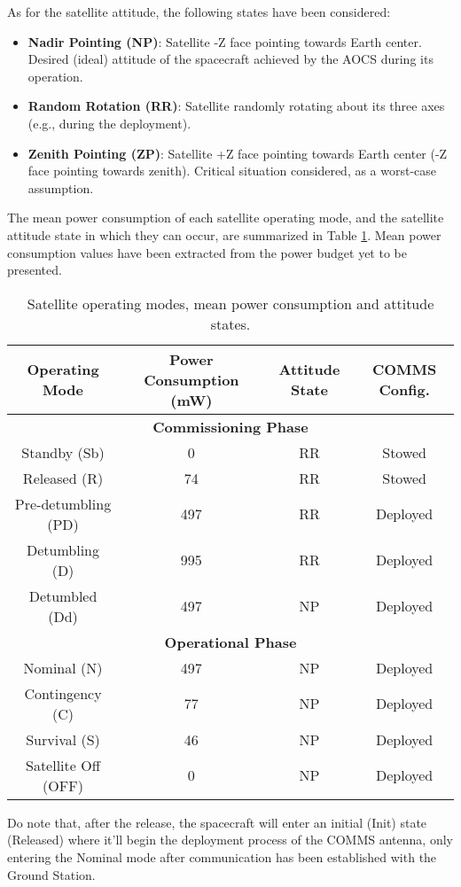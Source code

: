 As for the satellite attitude, the following states have been considered:

\begin{itemize}
    \item \textbf{Nadir Pointing (NP)}: Satellite -Z face pointing towards Earth center. Desired (ideal) attitude of the spacecraft achieved by the AOCS during its operation.
    \item \textbf{Random Rotation (RR)}: Satellite randomly rotating about its three axes (e.g., during the deployment).
    \item \textbf{Zenith Pointing (ZP)}: Satellite +Z face pointing towards Earth center (-Z face pointing towards zenith). Critical situation considered, as a worst-case assumption.
\end{itemize}

The mean power consumption of each satellite operating mode, and the satellite attitude state in which they can occur, are summarized in Table \ref{tab:satellite_modes}.
Mean power consumption values have been extracted from the power budget yet to be presented.


\begin{table}[H]
    \centering
    \begin{tabular}{cccc}
        \toprule
        \textbf{Operating Mode} & \textbf{Power Consumption (mW)} & \textbf{Attitude State} & \textbf{COMMS Config.} \\
        \midrule
        \multicolumn{4}{c}{\textbf{Commissioning Phase}} \\
        Standby (Sb)        & 0 & RR             & Stowed   \\
        Released (R)        & 74 & RR             & Stowed   \\
        Pre-detumbling (PD) & 497 & RR             & Deployed   \\
        Detumbling (D)      & 995 & RR             & Deployed   \\
        Detumbled (Dd)      & 497 & NP     & Deployed   \\
        \midrule
        \multicolumn{4}{c}{\textbf{Operational Phase}} \\
        Nominal (N)         & 497 & NP        & Deployed \\
        Contingency (C)     & 77 & NP      & Deployed \\
        Survival (S)        & 46 & NP       & Deployed \\
        Satellite Off (OFF) & 0 & NP       & Deployed \\
        \bottomrule
    \end{tabular}
    \caption{Satellite operating modes, mean power consumption and attitude states.}
    \label{tab:satellite_modes}
\end{table}
Do note that, after the release, the spacecraft will enter an initial (Init) state (Released) where it'll begin the deployment
process of the COMMS antenna, only entering the Nominal mode after communication has been established with the 
Ground Station.

